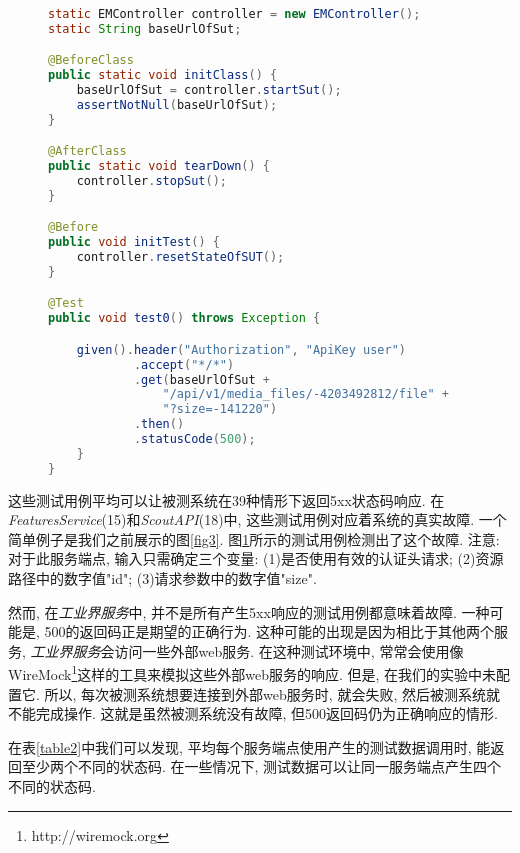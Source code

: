     \begin{figure}
        {
        \tt
        \tiny
      \begin{lstlisting}[language=java]
static EMController controller = new EMController();
static String baseUrlOfSut;

@BeforeClass
public static void initClass() {
    baseUrlOfSut = controller.startSut();
    assertNotNull(baseUrlOfSut);
}

@AfterClass
public static void tearDown() {
    controller.stopSut();
}

@Before
public void initTest() {
    controller.resetStateOfSUT();
}

@Test
public void test0() throws Exception {

    given().header("Authorization", "ApiKey user")
            .accept("*/*")
            .get(baseUrlOfSut + 
                "/api/v1/media_files/-4203492812/file" +
                "?size=-141220")
            .then()
            .statusCode(500);
    }
}
    \end{lstlisting}
        }
        \caption{}
        \label{fig5}
    \end{figure}
        
        这些测试用例平均可以让被测系统在39种情形下返回5xx状态码响应. 在\textit{FeaturesService}(15)和\textit{ScoutAPI}(18)中, 这些测试用例对应着系统的真实故障. 一个简单例子是我们之前展示的图\ref{fig3}. 图\ref{fig5}所示的测试用例检测出了这个故障. 注意: 对于此服务端点, 输入只需确定三个变量: (1)是否使用有效的认证头请求; (2)资源路径中的数字值"id"; (3)请求参数中的数字值"size". 
        
        然而, 在\textit{工业界服务}中, 并不是所有产生5xx响应的测试用例都意味着故障. 一种可能是, 500的返回码正是期望的正确行为. 这种可能的出现是因为相比于其他两个服务, \textit{工业界服务}会访问一些外部web服务. 在这种测试环境中, 常常会使用像WireMock\footnote{http://wiremock.org}这样的工具来模拟这些外部web服务的响应. 但是, 在我们的实验中未配置它. 所以, 每次被测系统想要连接到外部web服务时, 就会失败, 然后被测系统就不能完成操作. 这就是虽然被测系统没有故障, 但500返回码仍为正确响应的情形. 
        
        在表\ref{table2}中我们可以发现, 平均每个服务端点使用产生的测试数据调用时, 能返回至少两个不同的状态码. 在一些情况下, 测试数据可以让同一服务端点产生四个不同的状态码. 
        
    

